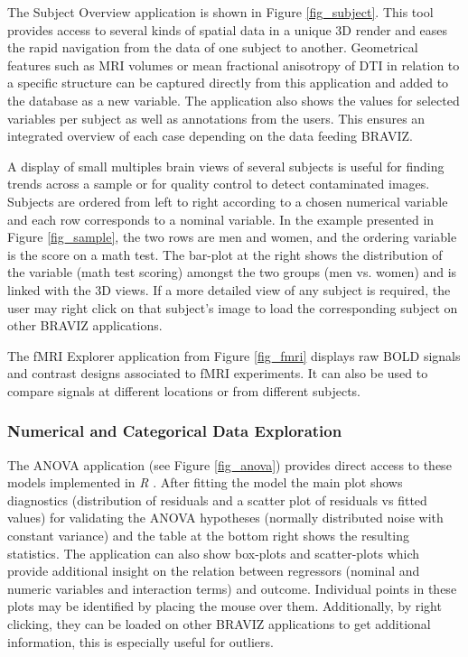 \documentclass[twocolumn]{svjour3}
\begin{document}
The Subject Overview application is shown in Figure \ref{fig_subject}. This tool  provides access to several kinds of spatial data in a unique 3D render and eases the rapid navigation from the data of one subject to another. Geometrical features such as MRI volumes or mean fractional anisotropy of DTI in relation to a specific structure can be captured directly from this application and added to the database as a new variable. The application also shows the values for selected variables per subject as well as annotations from the users. This ensures an integrated overview of each case depending on the data feeding BRAVIZ.

A display of small multiples \cite{tufte_visual_1983}  brain views  of several subjects is useful for finding trends across a sample or for quality control to detect contaminated images. Subjects are ordered from left to right according to a chosen numerical variable and each row corresponds to a nominal variable. In the example presented in Figure \ref{fig_sample}, the two rows are men and women, and the ordering variable is the score on a math test. The bar-plot at the right shows the distribution of the variable (math test scoring) amongst the two groups (men vs. women) and is linked with the 3D views. If a more detailed view of any subject is required, the user may right click on that subject’s image to load the corresponding subject on other BRAVIZ applications.

The fMRI Explorer application from Figure \ref{fig_fmri} displays raw BOLD signals and contrast designs associated to fMRI experiments. It can also be used to compare signals at different locations or from different subjects.



\subsubsection{Numerical and Categorical Data Exploration}

The ANOVA application (see Figure \ref{fig_anova}) provides direct access to these models implemented in \emph{R} \cite{team_r:_2012}. After fitting the model the main plot shows diagnostics (distribution of residuals and a scatter plot of residuals vs fitted values) for validating the ANOVA hypotheses (normally distributed noise with constant variance) and the table at the bottom right shows the resulting statistics. The application can also show box-plots and scatter-plots which provide additional insight on the relation between regressors (nominal and numeric variables and interaction terms) and outcome. Individual points in these plots may be identified by placing the mouse over them. Additionally, by right clicking, they can be loaded on other BRAVIZ applications to get additional information, this is especially useful for outliers.
\end{document}
